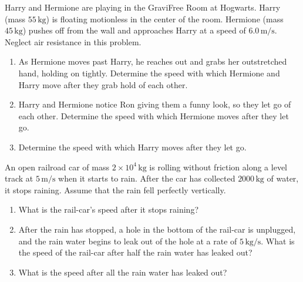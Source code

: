 \begin{exercise}
  Harry and Hermione are playing in the GraviFree Room at Hogwarts.
  Harry (mass $55\,\text{kg}$) is floating motionless in the center
  of the room.  Hermione (mass $45\,\text{kg}$) pushes off from the
  wall and approaches Harry at a speed of $6.0\,\text{m/s}$.  Neglect
  air resistance in this problem.
  \begin{enumerate}
  \item As Hermione moves past Harry, he reaches out and grabs her
    outstretched hand, holding on tightly.  Determine the speed with
    which Hermione and Harry move after they grab hold of each other.
 
  \item Harry and Hermione notice Ron giving them a funny look, so
    they let go of each other.  Determine the speed with which
    Hermione moves after they let go.

  \item Determine the speed with which Harry moves after they let go.
     
  \end{enumerate}
  \label{prob:hogwarts}
\end{exercise}


\begin{exercise}
  An open railroad car of mass $2\times 10^4\,\text{kg}$ is rolling
  without friction along a level track at $5\,\text{m/s}$ when it
  starts to rain.  After the car has collected $2000\,\text{kg}$ of
  water, it stops raining.  Assume that the rain fell perfectly
  vertically.
  \begin{enumerate}
  \item What is the rail-car's speed after it stops raining?

  \item After the rain has stopped, a hole in the bottom of the
    rail-car is unplugged, and the rain water begins to leak out of
    the hole at a rate of $5\,\text{kg/s}$.  What is the speed of the
    rail-car after half the rain water has leaked out?

  \item What is the speed after all the rain water has leaked out?
  \end{enumerate}
\end{exercise}


